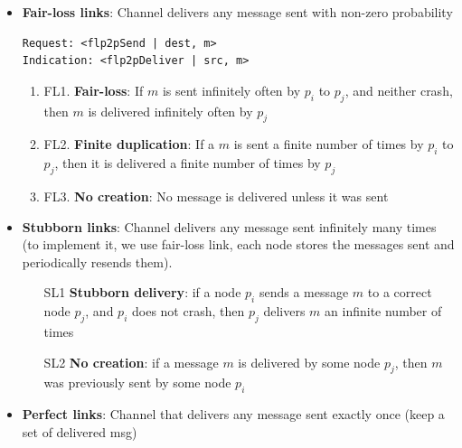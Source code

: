 \begin{itemize}
    \item \textbf{Fair-loss links}: Channel delivers any message sent
        with non-zero probability

        \begin{lstlisting}[caption= Fair loss link interface]
Request: <flp2pSend | dest, m>
Indication: <flp2pDeliver | src, m>
        \end{lstlisting}

        \begin{enumerate}
            \item FL1. \textbf{Fair-loss}: If $m$ is sent infinitely
                often by $p_i$
                to $p_j$, and neither crash, then $m$ is delivered infinitely
                often by $p_j$
            \item FL2. \textbf{Finite duplication}: If a $m$ is sent a finite
                number of times by $p_i$ to $p_j$, then it is delivered a
                finite number of times by $p_j$
            \item FL3. \textbf{No creation}: No message is delivered unless it
                was sent
        \end{enumerate}

    \item \textbf{Stubborn links}: Channel delivers any message sent
        infinitely many times (to implement it, we use fair-loss link, each node
        stores the messages sent and periodically resends them).

        

        \begin{enumerate}
            \item[SL1] \textbf{Stubborn delivery}: if a node $p_i$ sends a
                message $m$ to a correct node $p_j$, and $p_i$ does not
                crash, then $p_j$ delivers $m$ an infinite number of
                times

            \item[SL2] \textbf{No creation}: if a message $m$ is delivered by
                some node $p_j$, then $m$ was previously sent by
                some node $p_i$
        \end{enumerate}

    \item \textbf{Perfect links}: Channel that delivers any message
        sent exactly once (keep a set of delivered msg)


\end{itemize}
